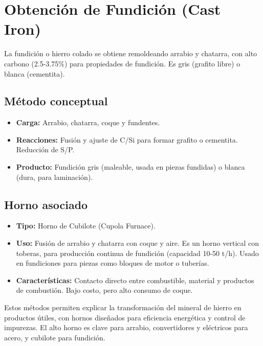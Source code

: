 \documentclass[12pt,a4paper]{article}
\begin{document}
\section{Obtención de Fundición (Cast Iron)}

La fundición o hierro colado se obtiene remoldeando arrabio y chatarra, con alto carbono (2.5-3.75\%) para propiedades de fundición. Es gris (grafito libre) o blanca (cementita).

\subsection{Método conceptual}

\begin{itemize}
    \item \textbf{Carga:} Arrabio, chatarra, coque y fundentes.
    \item \textbf{Reacciones:} Fusión y ajuste de C/Si para formar grafito o cementita. Reducción de S/P.
    \item \textbf{Producto:} Fundición gris (maleable, usada en piezas fundidas) o blanca (dura, para laminación).
\end{itemize}

\subsection{Horno asociado}

\begin{itemize}
    \item \textbf{Tipo:} Horno de Cubilote (Cupola Furnace).
    \item \textbf{Uso:} Fusión de arrabio y chatarra con coque y aire. Es un horno vertical con toberas, para producción continua de fundición (capacidad 10-50 t/h). Usado en fundiciones para piezas como bloques de motor o tuberías.
    \item \textbf{Características:} Contacto directo entre combustible, material y productos de combustión. Bajo costo, pero alto consumo de coque.
\end{itemize}

\begin{table}
    \caption{Tipos de Fundición}
\end{table}

Estos métodos permiten explicar la transformación del mineral de hierro en productos útiles, con hornos diseñados para eficiencia energética y control de impurezas. El alto horno es clave para arrabio, convertidores y eléctricos para acero, y cubilote para fundición.
\end{document}
